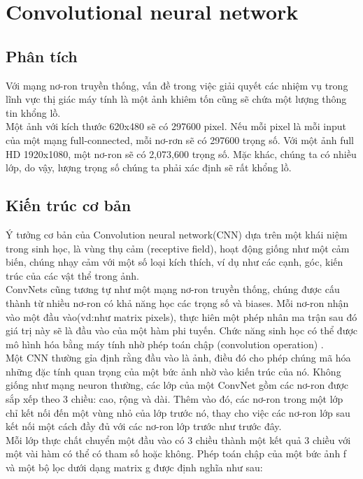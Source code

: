 \section{Convolutional neural network}
\subsection{Phân tích}

Với mạng nơ-ron truyền thống, vấn đề trong việc giải quyết các nhiệm vụ trong lĩnh vực thị giác máy tính là một ảnh khiêm tốn cũng sẽ chứa một lượng thông tin khổng lồ.\\

Một ảnh với kích thước 620x480 sẽ có 297600 pixel. Nếu mỗi pixel là mỗi input của một mạng full-connected, mỗi nơ-rơn sẽ có 297600 trọng số. Với một ảnh full HD 1920x1080, một nơ-ron sẽ có 2,073,600 trọng số. Mặc khác, chúng ta có nhiều lớp, do vậy, lượng trọng số chúng ta phải xác định sẽ rất khổng lồ.

\subsection{Kiến trúc cơ bản}
Ý tưởng cơ bản của Convolution neural network(CNN) dựa trên một khái niệm trong sinh học, là vùng thụ cảm (receptive field), hoạt động giống như một cảm biến, chúng nhạy cảm với một số loại kích thích, ví dụ như các cạnh, góc, kiến trúc của các vật thể trong ảnh.\\

ConvNets cũng tương tự như một mạng nơ-ron truyền thống, chúng được cấu thành từ nhiều nơ-ron có khả năng học các trọng số và biases. Mỗi nơ-ron nhận vào một đầu vào(vd:như matrix pixels), thực hiên một phép nhân ma trận sau đó giá trị này sẽ là đầu vào của một hàm phi tuyến. Chức năng sinh học có thể được mô hình hóa bằng máy tính nhờ phép toán chập (convolution operation) .\\

Một CNN thường gỉa định rằng đầu vào là ảnh, điều đó cho  phép chúng mã hóa những đặc tính quan trọng của một bức ảnh nhờ vào kiến trúc của nó. Không giống như mạng neuron thường, các lớp của một ConvNet gồm các nơ-ron được sắp xếp theo 3 chiều: cao, rộng và dài. Thêm vào đó, các nơ-ron trong một lớp chỉ kết nối đến một vùng nhỏ của lớp trước nó, thay cho việc các nơ-ron lớp sau kết nối một cách đầy đủ với các nơ-ron lớp trước như trước đây.\\

Mỗi lớp thực chất chuyển một đầu vào có 3 chiều thành một kết quả 3 chiều với một vài hàm có thể có tham số hoặc không. Phép toán chập của một bức ảnh f và một bộ lọc dưới dạng matrix g được định nghĩa như sau:

